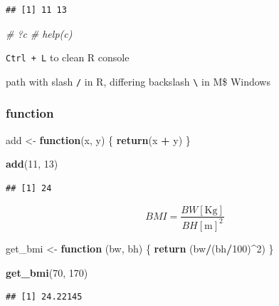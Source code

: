 \documentclass[
]{book}
\newenvironment{Shaded}{\begin{snugshade}}{\end{snugshade}}
\newcommand{\CommentTok}[1]{\textcolor[rgb]{0.56,0.35,0.01}{\textit{#1}}}
\newcommand{\ControlFlowTok}[1]{\textcolor[rgb]{0.13,0.29,0.53}{\textbf{#1}}}
\newcommand{\DecValTok}[1]{\textcolor[rgb]{0.00,0.00,0.81}{#1}}
\newcommand{\FunctionTok}[1]{\textcolor[rgb]{0.13,0.29,0.53}{\textbf{#1}}}
\newcommand{\NormalTok}[1]{#1}
\newcommand{\OtherTok}[1]{\textcolor[rgb]{0.56,0.35,0.01}{#1}}
\newcommand{\SpecialCharTok}[1]{\textcolor[rgb]{0.81,0.36,0.00}{\textbf{#1}}}
\theoremstyle{definition}
\theoremstyle{definition}
\theoremstyle{definition}
\theoremstyle{definition}
\theoremstyle{remark}
\begin{document}
\begin{verbatim}
## [1] 11 13
\end{verbatim}

\begin{Shaded}
\begin{Highlighting}[]
\CommentTok{\# ?c}
\CommentTok{\# help(c)}
\end{Highlighting}
\end{Shaded}

\texttt{Ctrl\ +\ L} to clean R console

path with slash \texttt{/} in R, differing backslash \texttt{\textbackslash{}} in M\$ Windows

\subsubsection{function}\label{function}

\begin{Shaded}
\begin{Highlighting}[]
\NormalTok{add }\OtherTok{\textless{}{-}} \ControlFlowTok{function}\NormalTok{(x, y) \{}
  \FunctionTok{return}\NormalTok{(x }\SpecialCharTok{+}\NormalTok{ y)}
\NormalTok{\}}

\FunctionTok{add}\NormalTok{(}\DecValTok{11}\NormalTok{, }\DecValTok{13}\NormalTok{)}
\end{Highlighting}
\end{Shaded}

\begin{verbatim}
## [1] 24
\end{verbatim}

\[
BMI = \dfrac{BW\left[\text{Kg}\right]}{{BH\left[\text{m}\right]}^2}
\]

\begin{Shaded}
\begin{Highlighting}[]
\NormalTok{get\_bmi }\OtherTok{\textless{}{-}} \ControlFlowTok{function}\NormalTok{ (bw, bh) \{}
  \FunctionTok{return}\NormalTok{ (bw}\SpecialCharTok{/}\NormalTok{(bh}\SpecialCharTok{/}\DecValTok{100}\NormalTok{)}\SpecialCharTok{\^{}}\DecValTok{2}\NormalTok{)}
\NormalTok{\}}

\FunctionTok{get\_bmi}\NormalTok{(}\DecValTok{70}\NormalTok{, }\DecValTok{170}\NormalTok{)}
\end{Highlighting}
\end{Shaded}

\begin{verbatim}
## [1] 24.22145
\end{verbatim}
\end{document}
